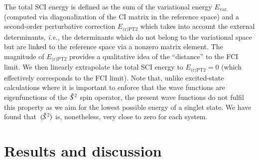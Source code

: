 \documentclass[aps,prb,reprint,noshowkeys,superscriptaddress]{revtex4-1}
\newcommand{\ie}{\textit{i.e.}}
\begin{document}
The total SCI energy is defined as the sum of the variational energy $E_\text{var.}$ (computed via diagonalization of the CI matrix in the reference space) and a second-order perturbative correction $E_\text{(r)PT2}$ which takes into account the external determinants, \ie, the determinants which do not belong to the variational space but are linked to the reference space via a nonzero matrix element. 
The magnitude of $E_\text{(r)PT2}$ provides a qualitative idea of the ``distance'' to the FCI limit.
We then linearly extrapolate the total SCI energy to $E_\text{(r)PT2} = 0$ (which effectively corresponds to the FCI limit). 
Note that, unlike excited-state calculations where it is important to enforce that the wave functions are eigenfunctions of the $\Hat{S}^2$ spin operator, \cite{Applencourt_2018} the present wave functions do not fulfil this property as we aim for the lowest possible energy of a singlet state. 
We have found that $\expval*{\Hat{S}^2}$ is, nonetheless, very close to zero for each system.


\section{Results and discussion}
\end{document}
